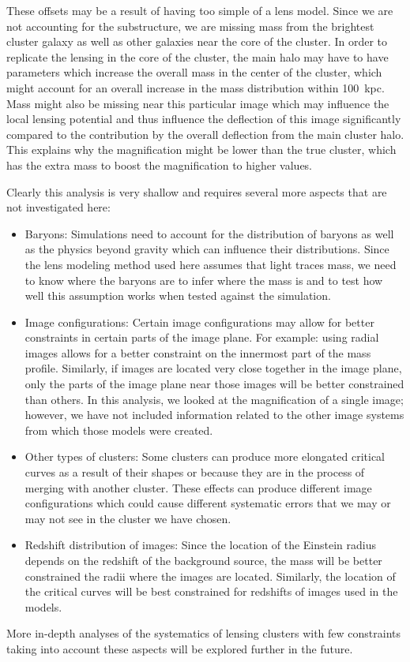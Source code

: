 These offsets may be a result of having too simple of a lens model. Since we are not accounting for the substructure, we are missing mass from the brightest cluster galaxy as well as other galaxies near the core of the cluster. In order to replicate the lensing in the core of the cluster, the main halo may have to have parameters which increase the overall mass in the center of the cluster, which might account for an overall increase in the mass distribution within 100~kpc. Mass might also be missing near this particular image which may influence the local lensing potential and thus influence the deflection of this image significantly compared to the contribution by the overall deflection from the main cluster halo. This explains why the magnification might be lower than the true cluster, which has the extra mass to boost the magnification to higher values.

Clearly this analysis is very shallow and requires several more aspects that are not investigated here:

\begin{itemize}
\item Baryons: Simulations need to account for the distribution of baryons as well as the physics beyond gravity which can influence their distributions. Since the lens modeling method used here assumes that light traces mass, we need to know where the baryons are to infer where the mass is and to test how well this assumption works when tested against the simulation.
\item Image configurations: Certain image configurations may allow for better constraints in certain parts of the image plane. For example: using radial images allows for a better constraint on the innermost part of the mass profile. Similarly, if images are located very close together in the image plane, only the parts of the image plane near those images will be better constrained than others. In this analysis, we looked at the magnification of a single image; however, we have not included information related to the other image systems from which those models were created.
\item Other types of clusters: Some clusters can produce more elongated critical curves as a result of their shapes or because they are in the process of merging with another cluster. These effects can produce different image configurations which could cause different systematic errors that we may or may not see in the cluster we have chosen.
\item Redshift distribution of images: Since the location of the Einstein radius depends on the redshift of the background source, the mass will be better constrained the radii where the images are located. Similarly, the location of the critical curves will be best constrained for redshifts of images used in the models. 
\end{itemize}

More in-depth analyses of the systematics of lensing clusters with few constraints taking into account these aspects will be explored further in the future.
